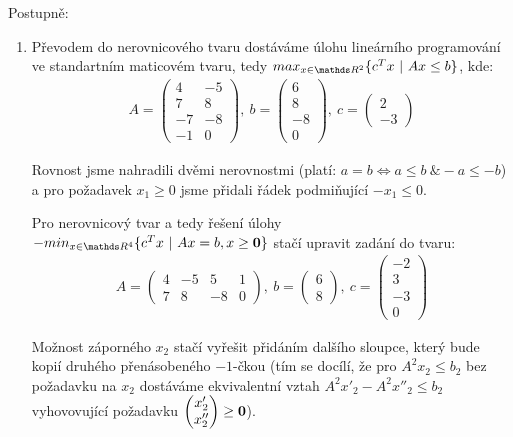 \begin{reseni}
Postupně:
\begin{enumerate}
\item
	Převodem do nerovnicového tvaru dostáváme úlohu lineárního programování ve
	standartním maticovém tvaru, tedy $max_{x \in \R^2} \{c^Tx~|~Ax \leq
	b\}$, kde:
	\begin{align*}
		A = \begin{pmatrix} 4 & -5 \\ 7 & 8 \\ -7 & -8 \\ -1 &  0 \end{pmatrix}\!,~
		b = \begin{pmatrix} 6 \\ 8 \\ -8 \\ 0 \end{pmatrix}\!,~
		c = \begin{pmatrix} 2 \\ -3 \end{pmatrix}
	\end{align*}

	Rovnost jsme nahradili dvěmi nerovnostmi (platí: $a = b \Leftrightarrow a
	\leq b~\& -a \leq -b$) a pro požadavek $x_1 \geq 0$ jsme přidali řádek
	podmiňující $-x_1 \leq 0$.

	Pro nerovnicový tvar a tedy řešení úlohy $-min_{x \in \R^4}
	\{c^Tx~|~Ax=b, x \geq \vec 0\}$ stačí upravit zadání do tvaru:
	\begin{align*}
		A = \begin{pmatrix} 4 & -5 & 5 & 1 \\ 7 & 8 & -8 & 0 \end{pmatrix}\!,~
		b = \begin{pmatrix} 6 \\ 8 \end{pmatrix}\!,~
		c = \begin{pmatrix} -2 \\ 3 \\ -3 \\ 0 \end{pmatrix}
	\end{align*}

	Možnost záporného $x_2$ stačí vyřešit přidáním dalšího sloupce, který bude
	kopií druhého přenásobeného $-1$-čkou (tím se docílí, že pro $A^2x_2 \leq b_2$
	bez požadavku na $x_2$ dostáváme ekvivalentní vztah $A^2x'_2 - A^2x''_2
	\leq b_2$ vyhovovující požadavku $\begin{pmatrix} x'_2 \\ x''_2 \end{pmatrix} \geq \mathbf 0$).
	

\end{enumerate}
\end{reseni}
